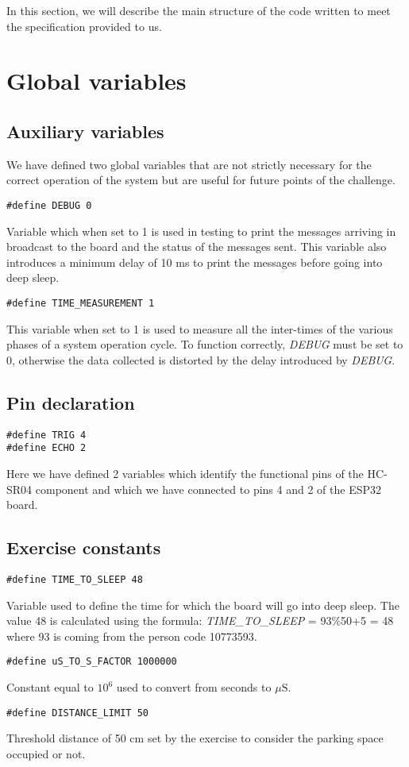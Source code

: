 In this section, we will describe the main structure of the code written to meet the specification provided to us.
\section{Global variables}
\subsection{Auxiliary variables}
We have defined two global variables that are not strictly necessary for the correct operation of the system but are useful for future points of the challenge.
\begin{verbatim}
#define DEBUG 0
\end{verbatim}
Variable which when set to 1 is used in testing to print the messages arriving in broadcast to the board and the status of the messages sent. This variable also introduces a minimum delay of 10 ms to print the messages before going into deep sleep.\\
\begin{verbatim}
#define TIME_MEASUREMENT 1
\end{verbatim}
This variable when set to 1 is used to measure all the inter-times of the various phases of a system operation cycle. To function correctly, \textit{DEBUG} must be set to 0, otherwise the data collected is distorted by the delay introduced by \textit{DEBUG}.


\subsection{Pin declaration}
\begin{verbatim}
#define TRIG 4
#define ECHO 2
\end{verbatim}
Here we have defined 2 variables which identify the functional pins of the HC-SR04 component and which we have connected to pins 4 and 2 of the ESP32 board.

\subsection{Exercise constants}
\begin{verbatim}
#define TIME_TO_SLEEP 48
\end{verbatim}
Variable used to define the time for which the board will go into deep sleep. The value 48 is calculated using the formula: \textit{TIME\_TO\_SLEEP} = 93\%50+5 = 48 \\
where 93 is coming from the person code 10773593. \\
\begin{verbatim}
#define uS_TO_S_FACTOR 1000000
\end{verbatim}
Constant equal to $10^6$ used to convert from seconds to $\mu\text{S}$.\\
\begin{verbatim}
#define DISTANCE_LIMIT 50
\end{verbatim}
Threshold distance of 50 cm set by the exercise to consider the parking space occupied or not.


